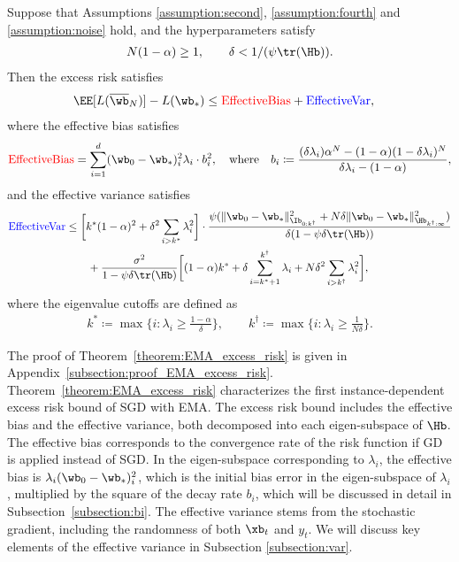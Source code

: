 \documentclass[11pt]{article}
\newcommand{\owb}{\overline{\wb}}
\begin{document}
\begin{theorem}\label{theorem:EMA_excess_risk}
Suppose that Assumptions \ref{assumption:second}, \ref{assumption:fourth} and \ref{assumption:noise} hold, and the hyperparameters satisfy
\begin{align*}
N(1-\alpha)\ge1,\qquad\delta<1/(\psi\tr(\Hb)).
\end{align*}
Then the excess risk satisfies
\begin{align*}
&\EE[L(\owb_N)]-L(\wb_*)\le\textcolor{red}{\mathrm{EffectiveBias}}+\textcolor{blue}{\mathrm{EffectiveVar}},
\end{align*}
where the effective bias satisfies
\begin{gather*}
\textcolor{red}{\mathrm{EffectiveBias}}=\sum_{i=1}^d(\wb_0-\wb_*)_i^2\lambda_i\cdot b_i^2,\text{\quad where\quad}b_i\coloneqq\frac{(\delta\lambda_i)\alpha^N-(1-\alpha)(1-\delta\lambda_i)^N}{\delta\lambda_i-(1-\alpha)},
\end{gather*}
and the effective variance satisfies
\begin{align*}
\textcolor{blue}{\mathrm{EffectiveVar}}&\le\bigg[k^*(1-\alpha)^2+\delta^2\sum_{i>k^*}\lambda_i^2\bigg]\cdot\frac{\psi(\|\wb_0-\wb_*\|_{\Ib_{0:k^\dagger}}^2+N\delta\|\wb_0-\wb_*\|_{\Hb_{k^\dagger:\infty}}^2)}{\delta(1-\psi\delta\tr(\Hb))}\\
&\qquad+\frac{\sigma^2}{1-\psi\delta\tr(\Hb)}\bigg[(1-\alpha)k^*+\delta\sum_{i=k^*+1}^{k^\dagger}\lambda_i+N\delta^2\sum_{i>k^\dagger}\lambda_i^2\bigg],
\end{align*}
where the eigenvalue cutoffs are defined as
\begin{align*}
k^*\coloneqq\max\Big\{i:\lambda_i\ge\frac{1-\alpha}{\delta}\Big\},\qquad k^\dagger\coloneqq\max\Big\{i:\lambda_i\ge\frac1{N\delta}\Big\}.
\end{align*}
\end{theorem}
The proof of Theorem~\ref{theorem:EMA_excess_risk} is given in Appendix~\ref{subsection:proof_EMA_excess_risk}.
Theorem~\ref{theorem:EMA_excess_risk} characterizes the first instance-dependent excess risk bound of SGD with EMA.
The excess risk bound includes the effective bias and the effective variance, both decomposed into each eigen-subspace of $\Hb$.
The effective bias corresponds to the convergence rate of the risk function if GD is applied instead of SGD.
In the eigen-subspace corresponding to $\lambda_i$, the effective bias is $\lambda_i(\wb_0-\wb_*)_i^2$, which is the initial bias error in the eigen-subspace of $\lambda_i$, multiplied by the square of the decay rate $b_i$, which will be discussed in detail in Subsection~\ref{subsection:bi}.
The effective variance stems from the stochastic gradient, including the randomness of both $\xb_t$ and $y_t$.
We will discuss key elements of the effective variance in Subsection \ref{subsection:var}.
\end{document}
